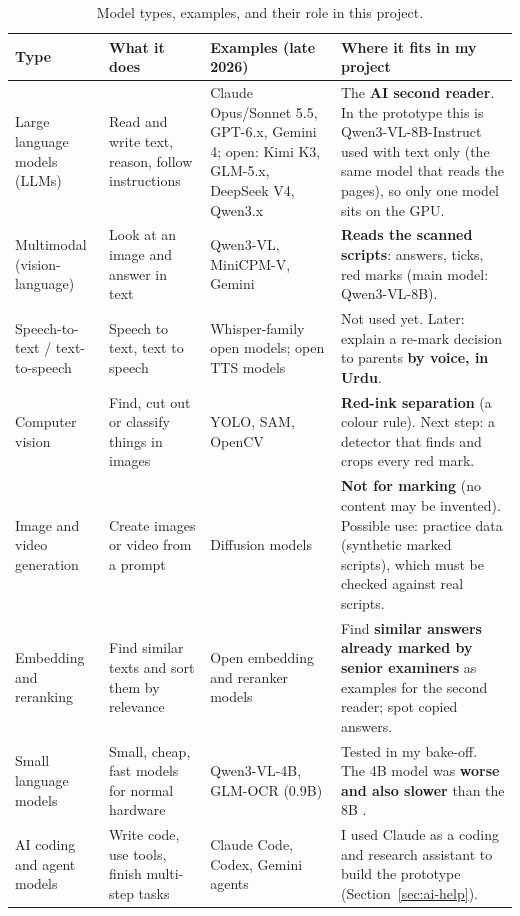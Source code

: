 \begin{table}[H]
\centering
\small
\caption{Model types, examples, and their role in this project.}
\label{tab:categories}
\begin{tabularx}{\linewidth}{@{}P{2.6cm}P{3.2cm}P{3.3cm}L@{}}
\toprule
\textbf{Type} & \textbf{What it does} & \textbf{Examples (late 2026)} & \textbf{Where it fits in my project} \\
\midrule
Large language models (LLMs) & Read and write text, reason, follow instructions &
  Claude Opus/Sonnet 5.5, GPT-6.x, Gemini 4; open: Kimi K3, GLM-5.x, DeepSeek V4, Qwen3.x &
  The \textbf{AI second reader}. In the prototype this is Qwen3-VL-8B-Instruct used with text only (the same model that
  reads the pages), so only one model sits on the GPU. \\
Multimodal (vision-language) & Look at an image and answer in text & Qwen3-VL, MiniCPM-V, Gemini &
  \textbf{Reads the scanned scripts}: answers, ticks, red marks (main model: Qwen3-VL-8B). \\
Speech-to-text / text-to-speech & Speech to text, text to speech & Whisper-family open models; open TTS models &
  Not used yet. Later: explain a re-mark decision to parents \textbf{by voice, in Urdu}. \\
Computer vision & Find, cut out or classify things in images & YOLO, SAM, OpenCV &
  \textbf{Red-ink separation} (a colour rule). Next step: a detector that finds and crops every red mark. \\
Image and video generation & Create images or video from a prompt & Diffusion models &
  \textbf{Not for marking} (no content may be invented). Possible use: practice data (synthetic marked scripts), which
  must be checked against real scripts. \\
Embedding and reranking & Find similar texts and sort them by relevance & Open embedding and reranker models &
  Find \textbf{similar answers already marked by senior examiners} as examples for the second reader; spot copied answers. \\
Small language models & Small, cheap, fast models for normal hardware & Qwen3-VL-4B, GLM-OCR (0.9B) &
  Tested in my bake-off. The 4B model was \textbf{worse and also slower} than the 8B . \\
AI coding and agent models & Write code, use tools, finish multi-step tasks & Claude Code, Codex, Gemini agents &
  I used Claude as a coding and research assistant to build the prototype (Section~\ref{sec:ai-help}). \\
\bottomrule
\end{tabularx}
\end{table}

